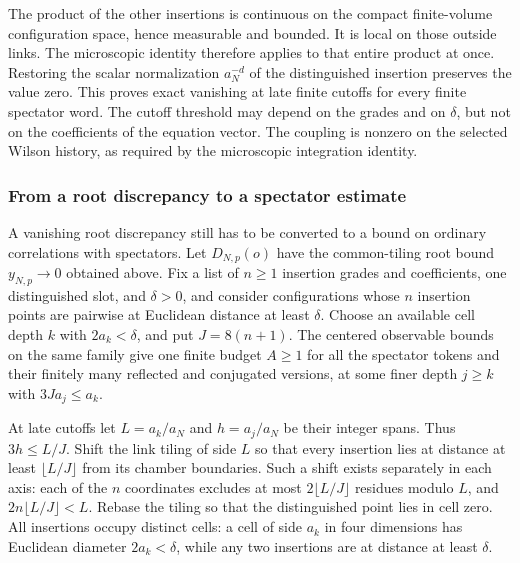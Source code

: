 The product of the other insertions is continuous on the compact
finite-volume configuration space, hence measurable and bounded. It is
local on those outside links. The microscopic identity therefore applies
to that entire product at once. Restoring the scalar normalization
$a_N^{-d}$ of the distinguished insertion preserves the value zero.
This proves exact vanishing at late finite cutoffs for every finite
spectator word. The cutoff threshold may depend on the grades and on
$\delta$, but not on the coefficients of the equation vector. The
coupling is nonzero on the selected Wilson history, as required by
the microscopic integration identity.

\subsubsection{From a root discrepancy to a spectator estimate}
\label{subsec:equation-spectator-price}

A vanishing root discrepancy still has to be converted to a bound on
ordinary correlations with spectators. Let $D_{N,p}(o)$ have the
common-tiling root bound $y_{N,p}\to0$ obtained above. Fix a list of
$n\ge1$ insertion grades and coefficients, one distinguished slot,
and $\delta>0$, and consider configurations whose $n$ insertion points
are pairwise at Euclidean distance at least $\delta$. Choose an
available cell depth $k$ with $2a_k<\delta$, and put $J=8(n+1)$. The centered observable bounds on
the same family give one finite budget $A\ge1$ for all the spectator
tokens and their finitely many reflected and conjugated versions,
at some finer depth $j\ge k$ with $3J a_j\le a_k$.

At late cutoffs let $L=a_k/a_N$ and $h=a_j/a_N$ be their integer
spans. Thus $3h\le L/J$. Shift the link tiling of side $L$ so that
every insertion lies at distance at least $\lfloor L/J\rfloor$ from
its chamber boundaries. Such a shift exists separately in each axis:
each of the $n$ coordinates excludes at most
$2\lfloor L/J\rfloor$ residues modulo $L$, and
$2n\lfloor L/J\rfloor<L$. Rebase the tiling so that the distinguished
point lies in cell zero. All insertions occupy distinct cells: a cell
of side $a_k$ in four dimensions has Euclidean diameter $2a_k<\delta$,
while any two insertions are at distance at least $\delta$.

